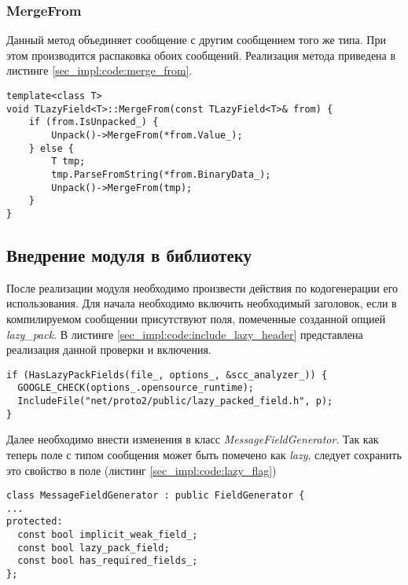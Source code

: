 \subsubsection{MergeFrom}

Данный метод объединяет сообщение с другим сообщением того же типа. При этом производится распаковка обоих сообщений.
Реализация метода приведена в листинге \ref{sec_impl:code:merge_from}.

\noindent\begin{minipage}{\linewidth}
\begin{lstlisting}[style=CodeListing, label=sec_impl:code:merge_from, caption={Реализация метода MergeFrom}]
template<class T>
void TLazyField<T>::MergeFrom(const TLazyField<T>& from) {
    if (from.IsUnpacked_) {
        Unpack()->MergeFrom(*from.Value_);
    } else {
        T tmp;
        tmp.ParseFromString(*from.BinaryData_);
        Unpack()->MergeFrom(tmp);
    }
}
\end{lstlisting}
\end{minipage}
\vspace{-1em}
\subsection{Внедрение модуля в библиотеку}

После реализации модуля необходимо произвести действия по кодогенерации его использования.
Для начала необходимо включить необходимый заголовок, если в компилируемом сообщении присутствуют поля, помеченные созданной опцией \textit{lazy\_pack}.
В листинге \ref{sec_impl:code:include_lazy_header} представлена реализация данной проверки и включения.

\begin{lstlisting}[style=CodeListing, label=sec_impl:code:include_lazy_header, caption={Включение заголовочного файла, если есть поля, помеченные опцией lazy\_pack}]
if (HasLazyPackFields(file_, options_, &scc_analyzer_)) {
  GOOGLE_CHECK(options_.opensource_runtime);
  IncludeFile("net/proto2/public/lazy_packed_field.h", p);
}
\end{lstlisting}

Далее необходимо внести изменения в класс \textit{MessageFieldGenerator}. 
Так как теперь поле с типом сообщения может быть помечено как \textit{lazy}, следует сохранить это свойство в поле (листинг \ref{sec_impl:code:lazy_flag})

\begin{lstlisting}[style=CodeListing, label=sec_impl:code:lazy_flag, caption={Добавление поля, сигнализируещего о наличии опции, отвечающей за ленивую десериализацию}]
class MessageFieldGenerator : public FieldGenerator {
...
protected:
  const bool implicit_weak_field_;
  const bool lazy_pack_field;
  const bool has_required_fields_;
};
\end{lstlisting}

